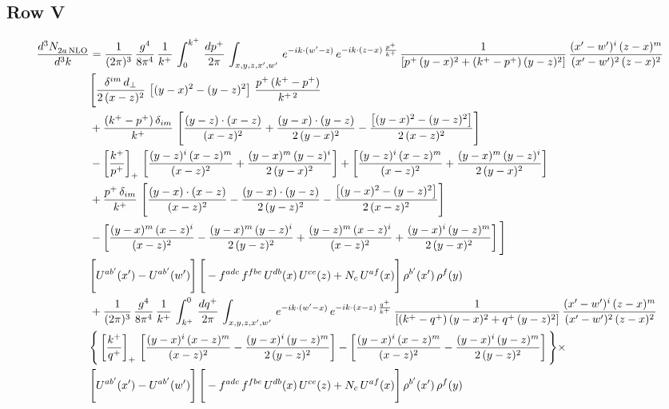 \documentclass[9pt]{article}
\numberwithin{equation}{section}
\begin{document}
\subsection{Row V}
\begin{align}
    \frac{d^{3}N_{2a\,\rm NLO}^{\rm}}{d^{3}k}  & =  \frac{1}{(2\pi)^{3}}\, \frac{g^{4}}{8\pi^{4}}\,\frac{1}{k^{+}}\,\int_{0}^{k^{+}}\, \frac{dp^{+}}{2\pi}\,\int_{x,y,z,x',w'}\, e^{-ik\cdot(w'-z)}\,e^{-ik\cdot (z-x)\,\frac{p^{+}}{k^{+}}}\,\frac{1}{\left[p^{+}\,(y-x)^{2}+(k^{+}-p^{+})\,(y-z)^{2}\right]}\, \frac{(x'-w')^{i}\,(z-x)^{m}}{(x'-w')^{2}\,(z-x)^{2}} \notag \\ & \Bigg[\frac{\delta^{im}\,d_{\perp}}{2\,(x-z)^{2}}\,\left[(y-x)^{2}-(y-z)^{2}\right]\,\frac{p^{+}\,(k^{+}-p^{+})}{k^{+\,2}}\notag \\ & +\frac{(k^{+}-p^{+})\,\delta_{im}}{k^{+}}\,\left[\frac{(y-z)\cdot (x-z)}{(x-z)^{2}}+\frac{(y-x)\cdot (y-z)}{2\,(y-x)^{2}}-\frac{\left[(y-x)^{2}-(y-z)^{2}\right]}{2\,(x-z)^{2}}\right]\notag \\ & -\left[\frac{k^{+}}{p^{+}}\right]_{+}\,\left[\frac{(y-z)^{i}\,(x-z)^{m}}{(x-z)^{2}}+\frac{(y-x)^{m}\,(y-z)^{i}}{2\,(y-x)^{2}}\right]+ \left[\frac{(y-z)^{i}\,(x-z)^{m}}{(x-z)^{2}}+\frac{(y-x)^{m}\,(y-z)^{i}}{2\,(y-x)^{2}}\right]\notag \\ & +\frac{p^{+}\,\delta_{im}}{k^{+}}\,\left[\frac{(y-x)\cdot (x-z)}{(x-z)^{2}}-\frac{(y-x)\cdot (y-z)}{2\,(y-z)^{2}}-\frac{\left[(y-x)^{2}-(y-z)^{2}\right]}{2\,(x-z)^{2}}\right]\notag \\ &-\left[\frac{(y-x)^{m}\,(x-z)^{i}}{(x-z)^{2}}-\frac{(y-x)^{m}\,(y-z)^{i}}{2\,(y-z)^{2}}+\frac{(y-z)^{m}\,(x-z)^{i}}{(x-z)^{2}}+\frac{(y-x)^{i}\,(y-z)^{m}}{2\,(y-x)^{2}}\right]\Bigg] \notag \\ & \Bigg[U^{ab'}(x')-U^{ab'}(w')\Bigg]\,\Bigg[-f^{adc}\,f^{fbe}\,U^{db}(x)\,U^{ce}(z)+N_{c}\,U^{af}(x)\Bigg]\,\rho^{b'}(x')\,\rho^{f}(y)\notag \\ & + \frac{1}{(2\pi)^{3}}\,\frac{g^{4}}{8\pi^{4}}\,\frac{1}{k^{+}}\, \int^{0}_{k^{+}}\, \frac{dq^{+}}{2\pi} \,  \int_{x,y,z,x',w'}\,e^{-ik\cdot(w'-x)}\,e^{-ik\cdot (x-z)\,\frac{q^{+}}{k^{+}}}\,\frac{1}{\left[(k^{+}-q^{+})\,(y-x)^{2}+q^{+}\,(y-z)^{2}\right]}\, \frac{(x'-w')^{i}\,(z-x)^{m}}{(x'-w')^{2}\,(z-x)^{2}} \notag \\ &\Bigg\{\left[\frac{k^{+}}{q^{+}}\right]_{+}\,\left[\frac{(y-x)^{i}\,(x-z)^{m}}{(x-z)^{2}}-\frac{(y-x)^{i}\,(y-z)^{m}}{2\,(y-z)^{2}}\right] -\left[\frac{(y-x)^{i}\,(x-z)^{m}}{(x-z)^{2}}-\frac{(y-x)^{i}\,(y-z)^{m}}{2\,(y-z)^{2}}\right]\Bigg\}\times\,\notag \\ & \Bigg[U^{ab'}(x')-U^{ab'}(w')\Bigg]\,\Bigg[-f^{adc}\,f^{fbe}\,U^{db}(x)\,U^{ce}(z)+N_{c}\,U^{af}(x)\Bigg]\,\rho^{b'}(x')\,\rho^{f}(y)
\end{align} 
\end{document}
